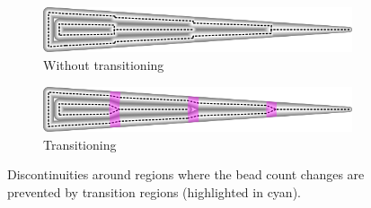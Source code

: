 \begin{figure}
\centering
\setlength{\figwidth}{\columnwidth}
\begin{subfigure}{0.9\figwidth}\centering
\includegraphics[width=\columnwidth]{sources/method/wedge_no_transitioning.png}
\caption{Without transitioning}
\end{subfigure}
\begin{subfigure}{0.9\figwidth}\centering
\includegraphics[width=\columnwidth]{sources/method/wedge_transitioning.png}
\caption{Transitioning}
\end{subfigure}
\caption{
Discontinuities around regions where the bead count changes are prevented by transition regions (highlighted in cyan).
}
\label{transitions}
\end{figure}














